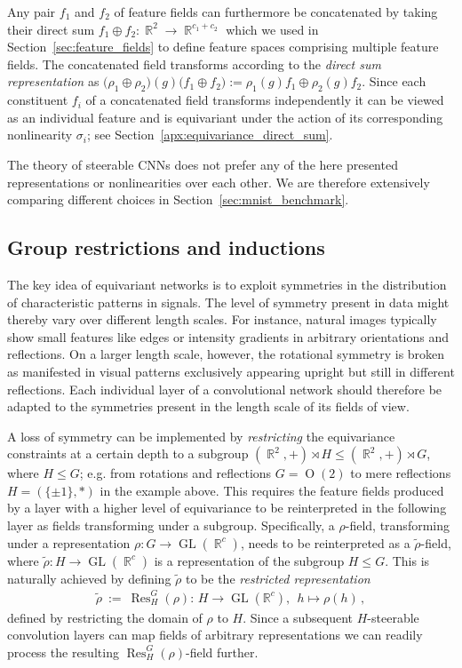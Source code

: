 \documentclass{article}
\DeclareMathOperator*{\R}{\mathbb{R}}
\newcommand{\GL}[1]{\ensuremath{\operatorname{GL}(#1)}}
\renewcommand{\O}[1]{\ensuremath{\operatorname{O}(#1)}}
\newlength{\secBefore}
\newlength{\secAfter}
\newlength{\subsecBefore}
\newlength{\subsecAfter}
\begin{document}
Any pair $f_1$ and $f_2$ of feature fields can furthermore be concatenated by taking their direct sum $f_1\oplus f_2:\R^2\to\R^{c_1+c_2}$ which we used in Section~\ref{sec:feature_fields} to define feature spaces comprising multiple feature fields.
The concatenated field transforms according to the \textit{direct sum representation} as
$\big(\rho_1\oplus\rho_2\big)(g)\big(f_1\oplus f_2\big) := \rho_1(g)f_1 \oplus \rho_2(g)f_2$.
Since each constituent $f_i$ of a concatenated field transforms independently it can be viewed as an individual feature and is equivariant under the action of its corresponding nonlinearity $\sigma_i$; see Section~\ref{apx:equivariance_direct_sum}.


The theory of steerable CNNs does not prefer any of the here presented representations or nonlinearities over each other.
We are therefore extensively comparing different choices in Section~\ref{sec:mnist_benchmark}.

 	

\vspace*{\subsecBefore}
\subsection{Group restrictions and inductions}
\label{sec:restriction}
\vspace*{\subsecAfter}

The key idea of equivariant networks is to exploit symmetries in the distribution of characteristic patterns in signals.
The level of symmetry present in data might thereby vary over different length scales.
For instance, natural images typically show small features like edges or intensity gradients in arbitrary orientations and reflections.
On a larger length scale, however, the rotational symmetry is broken as manifested in visual patterns exclusively appearing upright but still in different reflections.
Each individual layer of a convolutional network should therefore be adapted to the symmetries present in the length scale of its fields of view.

A loss of symmetry can be implemented by \textit{restricting} the equivariance constraints at a certain depth to a subgroup $(\R^2,+)\rtimes H \leq (\R^2,+)\rtimes G$, where $H\leq G$; e.g. from rotations and reflections $G=\O2$ to mere reflections $H=(\{\pm1\},*)$ in the example above.
This requires the feature fields produced by a layer with a higher level of equivariance to be reinterpreted in the following layer as fields transforming under a subgroup.
Specifically, a $\rho$-field, transforming under a representation $\rho:G\to\GL{\R^c}$, needs to be reinterpreted as a $\tilde{\rho}$-field, where $\tilde{\rho}:H\to\GL{\R^c}$ is a representation of the subgroup $H\leq G$.
This is naturally achieved by defining $\tilde{\rho}$ to be the \emph{restricted representation}
\begin{align}
    \tilde{\rho}\ :=\ \operatorname{Res}_H^G(\rho):\,H\to\GL{\mathbb{R}^c},\ \ h\mapsto\rho(h) \,,
\end{align}
defined by restricting the domain of $\rho$ to $H$.
Since a subsequent $H$-steerable convolution layers can map fields of arbitrary representations we can readily process the resulting $\operatorname{Res}_H^G(\rho)$-field further.
\end{document}
